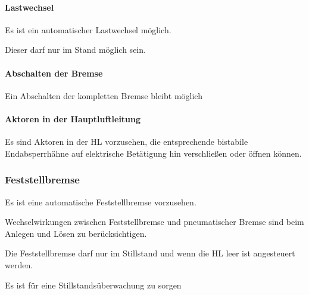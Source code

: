 \paragraph{Lastwechsel}
\begin{feat}
Es ist ein automatischer Lastwechsel möglich.
\end{feat}
\begin{rem}[zu Anf. 19]
Dieser darf nur im Stand möglich sein.
\end{rem}

\paragraph{Abschalten der Bremse}
\begin{feat}
Ein Abschalten der kompletten Bremse bleibt möglich
\end{feat}

\paragraph{Aktoren in der Hauptluftleitung}
\begin{feat}
Es sind Aktoren in der \acrshort{HL} vorzusehen, die entsprechende bistabile Endabsperrhähne auf elektrische Betätigung hin verschließen oder öffnen können.
\end{feat}

\subsubsection{Feststellbremse}
\begin{feat}
Es ist eine automatische Feststellbremse vorzusehen.
\end{feat}
\begin{feat}
Wechselwirkungen zwischen Feststellbremse und pneumatischer Bremse sind beim Anlegen und Lösen zu berücksichtigen.
\end{feat}
\begin{rem}[zu Anf. 23]
Die Feststellbremse darf nur im Stillstand und wenn die HL leer ist angesteuert werden.
\end{rem}
\begin{feat}
Es ist für eine Stillstandsüberwachung zu sorgen
\end{feat}


